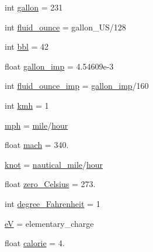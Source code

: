 \begin{DoxyCompactItemize}
\item 
int \hyperlink{namespacescipy_1_1constants_1_1constants_a5d058923d57aff1a2b6e72529cdf647f}{gallon} = 231
\item 
int \hyperlink{namespacescipy_1_1constants_1_1constants_a04d29fd12e4e0427765747422196e301}{fluid\+\_\+ounce} = gallon\+\_\+\+U\+S/128
\item 
int \hyperlink{namespacescipy_1_1constants_1_1constants_a429078b9781ed22855d32d48ffd07dd0}{bbl} = 42
\item 
float \hyperlink{namespacescipy_1_1constants_1_1constants_a8c2c56c12dfa87ad6edda3ea7163e087}{gallon\+\_\+imp} = 4.\+54609e-\/3
\item 
int \hyperlink{namespacescipy_1_1constants_1_1constants_a6e15717b77cb98b68d8e23d874bbe5b2}{fluid\+\_\+ounce\+\_\+imp} = \hyperlink{namespacescipy_1_1constants_1_1constants_a8c2c56c12dfa87ad6edda3ea7163e087}{gallon\+\_\+imp}/160
\item 
int \hyperlink{namespacescipy_1_1constants_1_1constants_adcf0c3bda69cbcf007d97a8b84c3599f}{kmh} = 1
\item 
\hyperlink{namespacescipy_1_1constants_1_1constants_a14227073c9f271d38259307ed2f03d48}{mph} = \hyperlink{namespacescipy_1_1constants_1_1constants_a4acfe577b41cc531db6a5667ffbfaa73}{mile}/\hyperlink{namespacescipy_1_1constants_1_1constants_a9eb15a607346da112902ac26dc7a9779}{hour}
\item 
float \hyperlink{namespacescipy_1_1constants_1_1constants_a362688df07f43e8e4f7d9d9da4c7fe54}{mach} = 340.
\item 
\hyperlink{namespacescipy_1_1constants_1_1constants_a7f4804d23e4a9d0f0a56c5a2e6cb6cc3}{knot} = \hyperlink{namespacescipy_1_1constants_1_1constants_a35b7dcc11f04ef7c19ee0f9f9d430ac4}{nautical\+\_\+mile}/\hyperlink{namespacescipy_1_1constants_1_1constants_a9eb15a607346da112902ac26dc7a9779}{hour}
\item 
float \hyperlink{namespacescipy_1_1constants_1_1constants_a101962f4fbb81d4a2a94b385aebecbfc}{zero\+\_\+\+Celsius} = 273.
\item 
int \hyperlink{namespacescipy_1_1constants_1_1constants_a503977f7da4b98806eac1bc386f2f5bd}{degree\+\_\+\+Fahrenheit} = 1
\item 
\hyperlink{namespacescipy_1_1constants_1_1constants_acafe0a16371d8a3a6834d0722fa8967f}{e\+V} = elementary\+\_\+charge
\item 
float \hyperlink{namespacescipy_1_1constants_1_1constants_ae7e226162eb2d4efc740c03a38a270c0}{calorie} = 4.
\item 

\end{DoxyCompactItemize}
